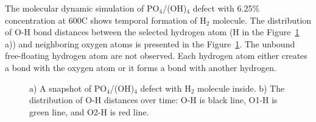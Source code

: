 The molecular dynamic simulation of PO$_4$/(OH)$_4$ defect with 6.25\% concentration at 600\textdegree C shows temporal formation of H$_2$ molecule. The distribution of O-H bond distances between the selected hydrogen atom (H in the Figure~\ref{ris:H2} a)) and neighboring oxygen atoms is presented in the Figure~\ref{ris:H2}. The unbound free-floating hydrogen atom are not observed. Each hydrogen atom either creates a bond with the oxygen atom or it forms a bond with another hydrogen. 

\begin{figure}[h!]
\begin{minipage}[h]{0.4\linewidth}
\end{minipage}
\hfill
\begin{minipage}[h]{0.6\linewidth}
\end{minipage}
\caption{a) A snapshot of PO$_4$/(OH)$_4$ defect with H$_2$ molecule inside. b) The distribution of O-H distances over time: O-H is black line, O1-H is green line, and O2-H is red line.}
\label{ris:H2}
\end{figure}

